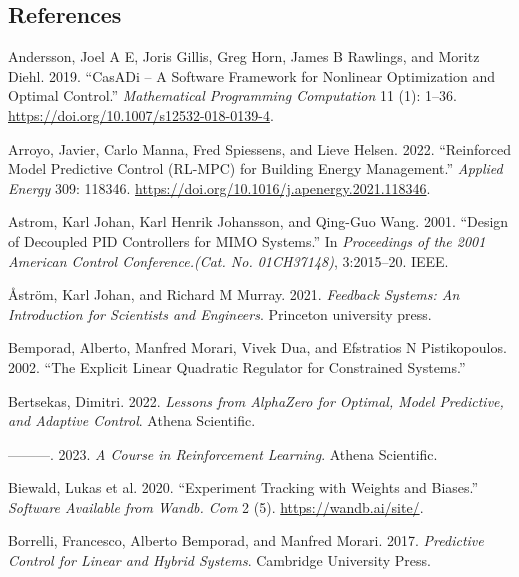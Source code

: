 \documentclass[
  letterpaper,
  DIV=11,
  numbers=noendperiod,
  oneside]{scrartcl}
\newlength{\cslhangindent}
\newenvironment{CSLReferences}[2] %
 {\begin{list}{}{%
  \setlength{\itemindent}{0pt}
  \setlength{\leftmargin}{0pt}
  \setlength{\parsep}{0pt}
  \ifodd #1
   \setlength{\leftmargin}{\cslhangindent}
   \setlength{\itemindent}{-1\cslhangindent}
  \fi
  \setlength{\itemsep}{#2\baselineskip}}}
 {\end{list}}
\begin{document}
\subsection{References}\label{references}

\label{refs}
\begin{CSLReferences}{1}{0}
Andersson, Joel A E, Joris Gillis, Greg Horn, James B Rawlings, and
Moritz Diehl. 2019. {``{CasADi} -- {A} Software Framework for Nonlinear
Optimization and Optimal Control.''} \emph{Mathematical Programming
Computation} 11 (1): 1--36.
\url{https://doi.org/10.1007/s12532-018-0139-4}.

Arroyo, Javier, Carlo Manna, Fred Spiessens, and Lieve Helsen. 2022.
{``Reinforced Model Predictive Control ({RL-MPC}) for Building Energy
Management.''} \emph{Applied Energy} 309: 118346.
\url{https://doi.org/10.1016/j.apenergy.2021.118346}.

Astrom, Karl Johan, Karl Henrik Johansson, and Qing-Guo Wang. 2001.
{``Design of Decoupled {PID} Controllers for {MIMO} Systems.''} In
\emph{Proceedings of the 2001 American Control {Conference}.({Cat}.
{No}. {01CH37148})}, 3:2015--20. IEEE.

Åström, Karl Johan, and Richard M Murray. 2021. \emph{Feedback Systems:
An Introduction for Scientists and Engineers}. Princeton university
press.

Bemporad, Alberto, Manfred Morari, Vivek Dua, and Efstratios N
Pistikopoulos. 2002. {``The Explicit Linear Quadratic Regulator for
Constrained Systems.''}

Bertsekas, Dimitri. 2022. \emph{Lessons from {AlphaZero} for Optimal,
Model Predictive, and Adaptive Control}. Athena Scientific.

---------. 2023. \emph{A Course in Reinforcement Learning}. Athena
Scientific.

Biewald, Lukas et al. 2020. {``Experiment Tracking with Weights and
Biases.''} \emph{Software Available from Wandb. Com} 2 (5).
\url{https://wandb.ai/site/}.

Borrelli, Francesco, Alberto Bemporad, and Manfred Morari. 2017.
\emph{Predictive Control for Linear and Hybrid Systems}. Cambridge
University Press.


\end{CSLReferences}
\end{document}
